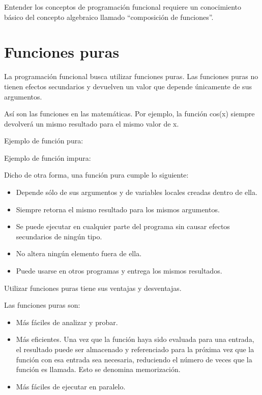 \documentclass{report}
\newcommand{\doble}[1]{``#1''}
\begin{document}
Entender los conceptos de programación funcional requiere un conocimiento básico del concepto algebraico llamado \doble{composición de funciones}.


\section{Funciones puras}

La programación funcional busca utilizar funciones puras. Las funciones puras no tienen efectos secundarios y devuelven un valor que depende únicamente de sus argumentos.

Así son las funciones en las matemáticas. Por ejemplo, la función cos(x) siempre devolverá un mismo resultado para el mismo valor de x.

Ejemplo de función pura:


Ejemplo de función impura:


Dicho de otra forma, una función pura cumple lo siguiente:

\begin{itemize}
  \item Depende sólo de sus argumentos y de variables locales creadas dentro de ella.
  \item Siempre retorna el mismo resultado para los mismos argumentos.
  \item Se puede ejecutar en cualquier parte del programa sin causar efectos secundarios de ningún tipo.
  \item No altera ningún elemento fuera de ella.
  \item Puede usarse en otros programas y entrega los mismos resultados.
\end{itemize}

Utilizar funciones puras tiene sus ventajas y desventajas.

Las funciones puras son:

\begin{itemize}
  \item Más fáciles de analizar y probar.
  \item Más eficientes. Una vez que la función haya sido evaluada para una entrada, el resultado puede ser almacenado y referenciado para la próxima vez que la función con esa entrada sea necesaria, reduciendo el número de veces que la función es llamada. Esto se denomina memorización.
  \item Más fáciles de ejecutar en paralelo.
\end{itemize}
\end{document}
